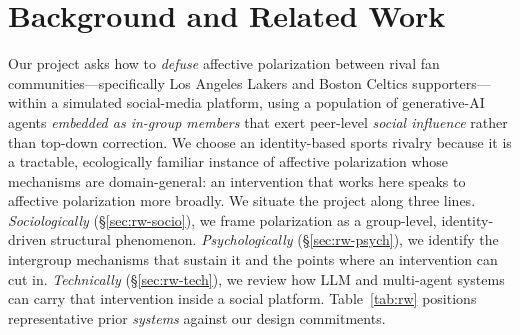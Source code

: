 
\newcommand{\yes}{\checkmark}
\newcommand{\no}{--}
\newcommand{\prt}{$\sim$}   %

\section{Background and Related Work}
\label{sec:background}

Our project asks how to \emph{defuse} affective polarization between rival fan
communities---specifically Los Angeles Lakers and Boston Celtics
supporters---within a simulated social-media platform, using a population of
generative-AI agents \emph{embedded as in-group members} that exert peer-level
\emph{social influence} rather than top-down correction. We choose an identity-based sports rivalry because it is a
tractable, ecologically familiar instance of affective polarization whose
mechanisms are domain-general: an intervention that works here speaks to
affective polarization more broadly. We situate the project along three lines.
\emph{Sociologically} (\S\ref{sec:rw-socio}), we frame polarization as a
group-level, identity-driven structural phenomenon. \emph{Psychologically}
(\S\ref{sec:rw-psych}), we identify the intergroup mechanisms that sustain it
and the points where an intervention can cut in. \emph{Technically}
(\S\ref{sec:rw-tech}), we review how LLM and multi-agent systems can carry that
intervention inside a social platform. Table~\ref{tab:rw} positions
representative prior \emph{systems} against our design commitments.

